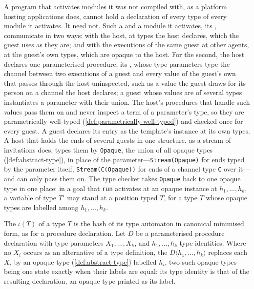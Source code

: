 A program that activates modules it was not compiled with, as a platform hosting applications does, cannot hold a declaration of every type of every module it activates.  It need not.  Such a  and a module it activates, its , communicate in two ways: with the host, at types the host declares, which the guest uses as they are; and with the executions of the same guest at other agents, at the guest's own types, which are opaque to the host.  For the second, the host declares one parameterised procedure, its , whose type parameters type the channel between two executions of a guest and every value of the guest's own that passes through the host uninspected, such as a value the guest draws for its person on a channel the host declares; a guest whose values are of several types instantiates a parameter with their union.  The host's procedures that handle such values pass them on and never inspect a term of a parameter's type, so they are parametrically well-typed (\cref{def:parametrically-well-typed}) and checked once for every guest.  A guest declares its entry as the template's instance at its own types.  A host that holds the ends of several guests in one structure, as a stream of invitations does, types them by \verb|Opaque|, the union of all opaque types (\cref{def:abstract-type}), in place of the parameter---\verb|Stream(Opaque)| for ends typed by the parameter itself, \verb|Stream(C(Opaque))| for ends of a channel type \verb|C| over it---and can only pass them on.  The type checker takes \verb|Opaque| back to one opaque type in one place: in a goal that \verb|run| activates at an opaque instance at $h_1, \ldots, h_k$, a variable of type $T^\circ$ may stand at a position typed $T$, for a type $T$ whose opaque types are labelled among $h_1, \ldots, h_k$.

\begin{definition}
\label{def:opaque-instance}
The  $\iota(T)$ of a type $T$ is the hash of its type automaton in canonical minimised form, as for a procedure declaration.  Let $D$ be a parameterised procedure declaration with type parameters $X_1, \ldots, X_k$, and $h_1, \ldots, h_k$ type identities.  Where no $X_i$ occurs as an alternative of a type definition, the  $D\langle h_1, \ldots, h_k\rangle$ replaces each $X_i$ by an opaque type (\cref{def:abstract-type}) labelled $h_i$, two such opaque types being one state exactly when their labels are equal; its type identity is that of the resulting declaration, an opaque type printed as its label.
\end{definition}

